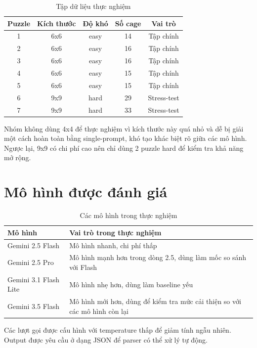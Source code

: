 \documentclass[12pt,a4paper,oneside]{report}
\newlength{\manualparindent}
\newcommand{\manualindent}{\hspace*{\manualparindent}}
\begin{document}
\begin{table}[H]
  \centering
  \caption{Tập dữ liệu thực nghiệm}
  \begin{tabular}{ccccc}
    \toprule
    Puzzle & Kích thước & Độ khó & Số cage & Vai trò \\
    \midrule
    1 & 6x6 & easy & 14 & Tập chính \\
    2 & 6x6 & easy & 16 & Tập chính \\
    3 & 6x6 & easy & 16 & Tập chính \\
    4 & 6x6 & easy & 15 & Tập chính \\
    5 & 6x6 & easy & 15 & Tập chính \\
    6 & 9x9 & hard & 29 & Stress-test \\
    7 & 9x9 & hard & 33 & Stress-test \\
    \bottomrule
  \end{tabular}
\end{table}

\manualindent%
Nhóm không dùng 4x4 để thực nghiệm vì kích thước này quá nhỏ và dễ bị giải một cách hoàn toàn bằng single-prompt, khó tạo khác biệt rõ giữa các mô hình. Ngược lại, 9x9 có chi phí cao nên chỉ dùng 2 puzzle hard để kiểm tra khả năng mở rộng.

\section{Mô hình được đánh giá}

\begin{table}[H]
  \centering
  \caption{Các mô hình trong thực nghiệm}
  \begin{tabularx}{\textwidth}{p{4.2cm}X}
    \toprule
    Mô hình & Vai trò trong thực nghiệm \\
    \midrule
    Gemini 2.5 Flash & Mô hình nhanh, chi phí thấp \\
    Gemini 2.5 Pro & Mô hình mạnh hơn trong dòng 2.5, dùng làm mốc so sánh với Flash \\
    Gemini 3.1 Flash Lite & Mô hình nhẹ hơn, dùng làm baseline yếu \\
    Gemini 3.5 Flash & Mô hình mới hơn, dùng để kiểm tra mức cải thiện so với các mô hình còn lại \\
    \bottomrule
  \end{tabularx}
\end{table}

\manualindent%
Các lượt gọi được cấu hình với temperature thấp để giảm tính ngẫu nhiên. Output được yêu cầu ở dạng JSON để parser có thể xử lý tự động.
\end{document}
